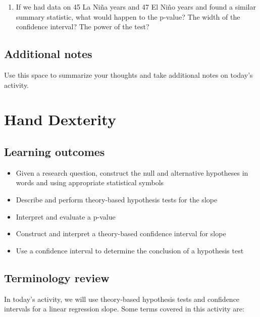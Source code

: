 \documentclass[
]{report}
\providecommand{\tightlist}{%
  \setlength{\itemsep}{0pt}\setlength{\parskip}{0pt}}
\begin{document}
\begin{enumerate}
\def\labelenumi{\arabic{enumi}.}
\setcounter{enumi}{20}
\tightlist
\item
  If we had data on 45 La Ni\~{n}a years and 47 El Ni\~{n}o years and found a similar summary statistic, what would happen to the p-value? The width of the confidence interval? The power of the test?
\end{enumerate}

\vspace{1in}

\hypertarget{additional-notes}{%
\section{Additional notes}\label{additional-notes}}

Use this space to summarize your thoughts and take additional notes on today's activity.

\hypertarget{hand-dexterity}{%
\chapter{Hand Dexterity}\label{hand-dexterity}}

\hypertarget{learning-outcomes}{%
\section{Learning outcomes}\label{learning-outcomes}}

\begin{itemize}
\item
  Given a research question, construct the null and alternative hypotheses
  in words and using appropriate statistical symbols
\item
  Describe and perform theory-based hypothesis tests for the slope
\item
  Interpret and evaluate a p-value
\item
  Construct and interpret a theory-based confidence interval for slope
\item
  Use a confidence interval to determine the conclusion of a hypothesis test
\end{itemize}

\hypertarget{terminology-review}{%
\section{Terminology review}\label{terminology-review}}

In today's activity, we will use theory-based hypothesis tests and confidence intervals for a linear regression slope. Some terms covered in this activity are:
\end{document}
